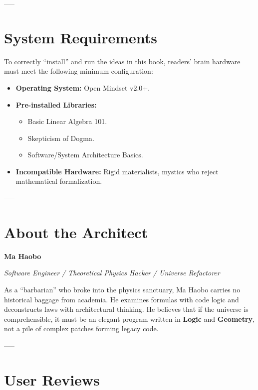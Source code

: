-----

\section{System Requirements}

To correctly ``install'' and run the ideas in this book, readers' brain hardware must meet the following minimum configuration:

\begin{itemize}
\item \textbf{Operating System:} Open Mindset v2.0+.

\item \textbf{Pre-installed Libraries:}

\begin{itemize}
\item Basic Linear Algebra 101.

\item Skepticism of Dogma.

\item Software/System Architecture Basics.
\end{itemize}

\item \textbf{Incompatible Hardware:} Rigid materialists, mystics who reject mathematical formalization.
\end{itemize}

-----

\section{About the Architect}

\textbf{Ma Haobo}

\textit{Software Engineer / Theoretical Physics Hacker / Universe Refactorer}

As a ``barbarian'' who broke into the physics sanctuary, Ma Haobo carries no historical baggage from academia. He examines formulas with code logic and deconstructs laws with architectural thinking. He believes that if the universe is comprehensible, it must be an elegant program written in \textbf{Logic} and \textbf{Geometry}, not a pile of complex patches forming legacy code.

-----

\section{User Reviews}

